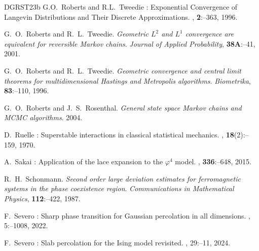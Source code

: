 \documentclass[11pt,a4paper]{article}
\theoremstyle{definition}
\numberwithin{equation}{section}
\begin{document}
\begin{thebibliography}{DGRST23b}
G.O.~\bgroup\fonteauteurs\bgroup Roberts\egroup\egroup{} and R.L.~\bgroup\fonteauteurs\bgroup Tweedie\egroup\egroup{} :
\newblock Exponential Convergence of Langevin Distributions and Their Discrete Approximations.
, \textbf{2}\string:--363, 1996.

\bgroup\fonteauteurs\bgroup G.~O.~Roberts and R.~L.~Tweedie\egroup\egroup. 
\emph{Geometric $L^2$ and $L^1$ convergence are equivalent for reversible Markov chains}. 
\emph{Journal of Applied Probability}, \textbf{38A}:--41, 2001.

\bgroup\fonteauteurs\bgroup G.~O.~Roberts and R.~L.~Tweedie\egroup\egroup. 
\emph{Geometric convergence and central limit theorems for multidimensional Hastings and Metropolis algorithms}. 
\emph{Biometrika}, \textbf{83}:--110, 1996.

\bgroup\fonteauteurs\bgroup G.~O.~Roberts and J.~S.~Rosenthal\egroup\egroup. 
\emph{General state space Markov chains and MCMC algorithms}. 
2004.


D.~\bgroup\fonteauteurs\bgroup Ruelle\egroup\egroup{} :
\newblock Superstable interactions in classical statistical mechanics.
, \textbf{18}(2)\string:--159, 1970.

A.~\bgroup\fonteauteurs\bgroup Sakai\egroup\egroup{} :
\newblock Application of the lace expansion to the $\varphi^4$ model.
, \textbf{336}\string:--648, 2015.

\bgroup\fonteauteurs\bgroup R.~H.~Schonmann\egroup\egroup. 
\emph{Second order large deviation estimates for ferromagnetic systems in the phase coexistence region}. 
\emph{Communications in Mathematical Physics}, \textbf{112}:--422, 1987.



F.~\bgroup\fonteauteurs\bgroup Severo\egroup\egroup{} :
\newblock Sharp phase transition for {Gaussian} percolation in all dimensions.
, 5\string:--1008, 2022.

F.~\bgroup\fonteauteurs\bgroup Severo\egroup\egroup{} :
\newblock Slab percolation for the {I}sing model revisited.
, 29\string:--11, 2024.


\end{thebibliography}
\end{document}
